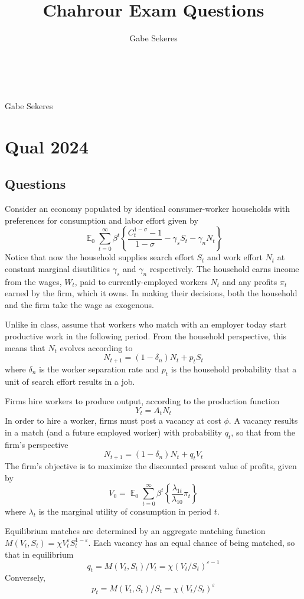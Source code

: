 \documentclass[10pt]{article}
\title{Chahrour Exam Questions}
\author{Gabe Sekeres}
\makeatletter
\newcommand{\expect}{\mathop{\mathbb{E}}} %
\newcommand{\curll}{\left\{}
\newcommand{\curlr}{\right\}}
\theoremstyle{plain}
\theoremstyle{definition}
\renewcommand{\maketitle}{
    \begin{tcolorbox}[colframe=darkgray]
        \begin{center}
            \textbf{\@course} \\[0.25em]
            {\Large\textit{\@entitle}} \\[0.5em]
            Gabe Sekeres \\[0.5em]
            \@term
        \end{center}
    \end{tcolorbox}
    \vspace{1em}
}
\makeatother
\begin{document}
\maketitle


\tableofcontents

\newpage

\section{Qual 2024}

\subsection{Questions}

Consider an economy populated by identical consumer-worker households with preferences for consumption and labor effort given by
\[
\expect_0 \sum_{t=0}^\infty \beta^t \curll \frac{C_t^{1-\sigma} - 1}{1-\sigma} - \gamma_s S_t - \gamma_n N_t \curlr
\]
Notice that now the household supplies search effort $S_t$ and work effort $N_t$ at constant marginal disutilities $\gamma_s$ and $\gamma_n$ respectively. The household earns income from the wages, $W_t$, paid to currently-employed workers $N_t$ and any profits $\pi_t$ earned by the firm, which it owns. In making their decisions, both the household and the firm take the wage as exogenous.

Unlike in class, assume that workers who match with an employer today start productive work in the following period. From the household perspective, this means that $N_t$ evolves according to
\[
N_{t+1} = (1-\delta_n)N_t+p_tS_t
\]
where $\delta_n$ is the worker separation rate and $p_t$ is the household probability that a unit of search effort results in a job. 

Firms hire workers to produce output, according to the production function
\[
Y_t = A_tN_t
\]
In order to hire a worker, firms must post a vacancy at cost $\phi$. A vacancy results in a match (and a future employed worker) with probability $q_t$, so that from the firm's perspective
\[
N_{t+1} = (1-\delta_n) N_t + q_tV_t
\]
The firm's objective is to maximize the discounted present value of profits, given by
\[
V_0 = \expect_0 \sum_{t=0}^\infty \beta^t \curll \frac{\lambda_{1t}}{\lambda_{10}}\pi_t \curlr 
\]
where $\lambda_t$ is the marginal utility of consumption in period $t$. 

Equilibrium matches are determined by an aggregate matching function $M(V_t,S_t) = \chi V_t^\varepsilon S_t^{1-\varepsilon}$. Each vacancy has an equal chance of being matched, so that in equilibrium
\[
q_t = M(V_t,S_t) / V_t = \chi (V_t / S_t)^{\varepsilon - 1}
\]
Conversely,
\[
p_t = M(V_t,S_t) / S_t = \chi (V_t / S_t)^{\varepsilon}
\]
\end{document}
